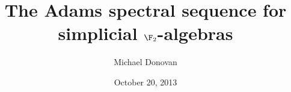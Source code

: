 \documentclass[14pt]{beamer}
\renewcommand{\calC}{\scrK}
\begin{document}
\title{The Adams spectral sequence for simplicial $\F_2$-algebras}   
\author{Michael Donovan} 
\date{October 20, 2013} 

%
%
%
%
%
\end{document}
